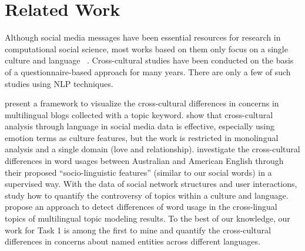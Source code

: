 \section{Related Work}
\label{sec:related}

Although social media messages have been essential resources for research in computational social science, most works based on them only focus on a single culture and language ~\cite{Petrovic2010StreamingFS,Paul2011YouAW,Rosenthal2015ICA,Wang2015ThatsSA,Zhang2015ContextawareEM,DBLP:conf/aclnut/LinXLZ17}.
Cross-cultural studies have been conducted on the basis of a questionnaire-based approach for many years.
There are only a few of such studies using NLP techniques.

\citet{nakasaki2009visualizing} present a framework to visualize the cross-cultural differences in concerns in multilingual blogs collected with a topic keyword.  
\citet{elahi2012examination} show that cross-cultural analysis through language in social media data is effective, especially using emotion terms as culture features, but the work is restricted in monolingual analysis and a single domain (love and relationship).
\citet{Garimella2016IdentifyingCD} investigate the cross-cultural 
differences in word usages between Australian and American English through 
their proposed ``socio-linguistic features'' (similar to our social words) in a supervised way. 
With the data of social network structures and user interactions, \citet{Garimella2016QuantifyingCI} study how to quantify the controversy of topics within a culture and language.
\citet{Gutirrez2016DetectingCD} propose an approach to detect differences of word usage in the cross-lingual topics of multilingual topic modeling results.
To the best of our knowledge, our work for Task 1 is among the first to mine and quantify the cross-cultural differences in concerns about named entities across different languages.


